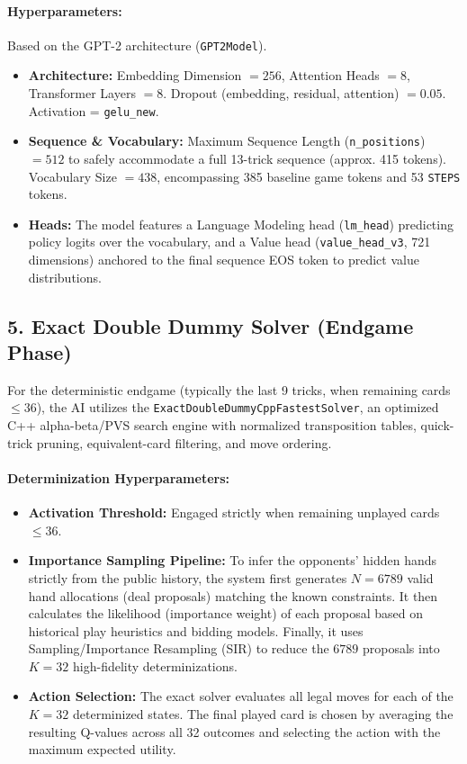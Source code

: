 \documentclass{article}
\begin{document}
\paragraph{Hyperparameters:}
Based on the GPT-2 architecture (\texttt{GPT2Model}).
\begin{itemize}
    \item \textbf{Architecture:} Embedding Dimension $= 256$, Attention Heads $= 8$, Transformer Layers $= 8$. Dropout (embedding, residual, attention) $= 0.05$. Activation = \texttt{gelu\_new}.
    \item \textbf{Sequence \& Vocabulary:} Maximum Sequence Length (\texttt{n\_positions}) $= 512$ to safely accommodate a full 13-trick sequence (approx. 415 tokens). Vocabulary Size $= 438$, encompassing 385 baseline game tokens and 53 \texttt{STEPS} tokens.
    \item \textbf{Heads:} The model features a Language Modeling head (\texttt{lm\_head}) predicting policy logits over the vocabulary, and a Value head (\texttt{value\_head\_v3}, 721 dimensions) anchored to the final sequence EOS token to predict value distributions.
\end{itemize}

\subsection{5. Exact Double Dummy Solver (Endgame Phase)}

For the deterministic endgame (typically the last 9 tricks, when remaining cards $\leq 36$), the AI utilizes the \texttt{ExactDoubleDummyCppFastestSolver}, an optimized C++ alpha-beta/PVS search engine with normalized transposition tables, quick-trick pruning, equivalent-card filtering, and move ordering.

\paragraph{Determinization Hyperparameters:}
\begin{itemize}
    \item \textbf{Activation Threshold:} Engaged strictly when remaining unplayed cards $\leq 36$.
    \item \textbf{Importance Sampling Pipeline:} To infer the opponents' hidden hands strictly from the public history, the system first generates $N = 6789$ valid hand allocations (deal proposals) matching the known constraints. It then calculates the likelihood (importance weight) of each proposal based on historical play heuristics and bidding models. Finally, it uses Sampling/Importance Resampling (SIR) to reduce the $6789$ proposals into $K = 32$ high-fidelity determinizations.
    \item \textbf{Action Selection:} The exact solver evaluates all legal moves for each of the $K=32$ determinized states. The final played card is chosen by averaging the resulting Q-values across all 32 outcomes and selecting the action with the maximum expected utility.
\end{itemize}
\end{document}

